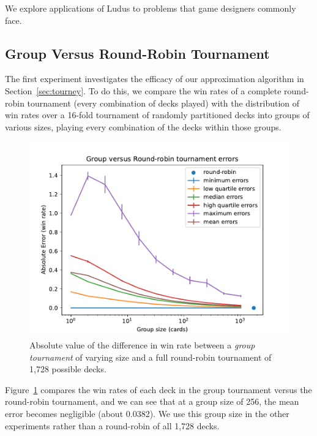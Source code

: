 We explore applications of {\sc Ludus} to problems that game designers commonly face.

\subsection{Group Versus Round-Robin Tournament}

The first experiment %
investigates the efficacy of our approximation algorithm in Section~\ref{sec:tourney}. To do this, we compare the win rates %
of a complete round-robin tournament (every combination of decks played) with the distribution of win rates over a 16-fold tournament of %
randomly partitioned decks into groups of various sizes, playing every combination of the decks within those groups.

\begin{figure}[t]
	\centering
	\includegraphics[width=0.9\columnwidth]{group_vs_rr_fig}
	\caption{Absolute value of the difference in win rate between a \textit{group tournament} of varying size and a full round-robin tournament of 1,728 possible decks. %
	}
	\label{fig:group_vs_rr}
\end{figure}


Figure~\ref{fig:group_vs_rr} compares the win rates of each deck in the group tournament versus the round-robin tournament, and we can see that at a group size of 256, the mean error becomes negligible (about 0.0382). We use this group size in the other experiments rather than a round-robin of all 1,728 decks.

